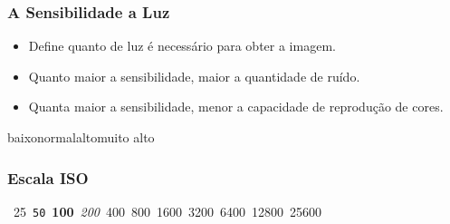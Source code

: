 

\begin{frame}
    \frametitle{A Sensibilidade a Luz}
    \begin{itemize}
        \item Define quanto de luz é necessário para obter a imagem.
        \item Quanto maior a sensibilidade, maior a quantidade de ruído.
        \item Quanta maior a sensibilidade, menor a capacidade de reprodução de cores.
    \end{itemize}
\end{frame}

\begin{frame}
    \hspace{0.5cm}baixo\hspace{0.5cm}normal\hspace{2cm}alto\hspace{3cm}muito alto
    \frametitle{Escala ISO}
    \vfill
    \begin{center}
    \mbox{
    \large 25
    \hfill
    \large \texttt{50}
    \hfill
    \large \textbf{100}
    \hfill
    \large \textit{200}
    \hfill
    \large 400
    \hfill
    \large 800
    \hfill
    \large 1600
    \hfill
    \large 3200
    \hfill
    \large 6400
    \hfill
    \large 12800
    \hfill
    \large 25600
    \hfill
    }
    \end{center}
    \vfill
\end{frame}



